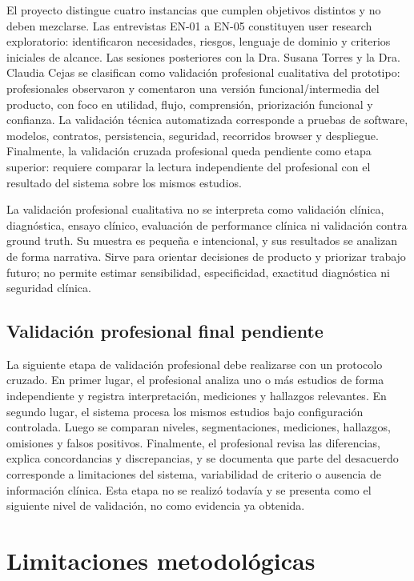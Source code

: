 El proyecto distingue cuatro instancias que cumplen objetivos distintos y no deben mezclarse. Las entrevistas EN-01 a EN-05 constituyen user research exploratorio: identificaron necesidades, riesgos, lenguaje de dominio y criterios iniciales de alcance. Las sesiones posteriores con la Dra. Susana Torres y la Dra. Claudia Cejas se clasifican como validación profesional cualitativa del prototipo: profesionales observaron y comentaron una versión funcional/intermedia del producto, con foco en utilidad, flujo, comprensión, priorización funcional y confianza. La validación técnica automatizada corresponde a pruebas de software, modelos, contratos, persistencia, seguridad, recorridos browser y despliegue. Finalmente, la validación cruzada profesional queda pendiente como etapa superior: requiere comparar la lectura independiente del profesional con el resultado del sistema sobre los mismos estudios.

La validación profesional cualitativa no se interpreta como validación clínica, diagnóstica, ensayo clínico, evaluación de performance clínica ni validación contra ground truth. Su muestra es pequeña e intencional, y sus resultados se analizan de forma narrativa. Sirve para orientar decisiones de producto y priorizar trabajo futuro; no permite estimar sensibilidad, especificidad, exactitud diagnóstica ni seguridad clínica.

\subsection{Validación profesional final pendiente}
\label{sec:metodologia-validacion-cruzada-pendiente}

La siguiente etapa de validación profesional debe realizarse con un protocolo cruzado. En primer lugar, el profesional analiza uno o más estudios de forma independiente y registra interpretación, mediciones y hallazgos relevantes. En segundo lugar, el sistema procesa los mismos estudios bajo configuración controlada. Luego se comparan niveles, segmentaciones, mediciones, hallazgos, omisiones y falsos positivos. Finalmente, el profesional revisa las diferencias, explica concordancias y discrepancias, y se documenta que parte del desacuerdo corresponde a limitaciones del sistema, variabilidad de criterio o ausencia de información clínica. Esta etapa no se realizó todavía y se presenta como el siguiente nivel de validación, no como evidencia ya obtenida.
\section{Limitaciones metodológicas}

